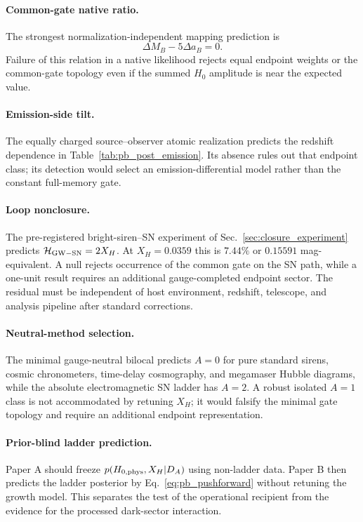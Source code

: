 \documentclass[aps,prd,twocolumn,10pt,superscriptaddress,nofootinbib]{revtex4-2}
\begin{document}
\paragraph{Common-gate native ratio.}
The strongest normalization-independent mapping prediction is
\begin{equation}
\Delta M_B-5\Delta a_B=0.
\label{eq:pb_native_null}
\end{equation}
Failure of this relation in a native likelihood rejects equal endpoint
weights or the common-gate topology even if the summed $H_0$ amplitude is
near the expected value.

\paragraph{Emission-side tilt.}
The equally charged source--observer atomic realization predicts the
redshift dependence in Table~\ref{tab:pb_post_emission}.  Its absence rules
out that endpoint class; its detection would select an emission-differential
model rather than the constant full-memory gate.

\paragraph{Loop nonclosure.}
The pre-registered bright-siren--SN experiment of
Sec.~\ref{sec:closure_experiment} predicts
$\mathcal H_{\rm GW-SN}=2X_H$.  At $X_H=0.0359$ this is $7.44\%$ or
$0.15591$ mag-equivalent.  A null rejects occurrence of the common gate on
the SN path, while a one-unit result requires an additional gauge-completed
endpoint sector.  The residual must be independent of host environment,
redshift, telescope, and analysis pipeline after standard corrections.

\paragraph{Neutral-method selection.}
The minimal gauge-neutral bilocal predicts $A=0$ for pure standard sirens,
cosmic chronometers, time-delay cosmography, and megamaser Hubble diagrams,
while the absolute electromagnetic SN ladder has $A=2$.  A robust isolated
$A=1$ class is not accommodated by retuning $X_H$; it would falsify the
minimal gate topology and require an additional endpoint representation.

\paragraph{Prior-blind ladder prediction.}
Paper A should freeze $p(H_{0,\rm phys},X_H|D_A)$ using non-ladder data.
Paper B then predicts the ladder posterior by Eq.~\eqref{eq:pb_pushforward}
without retuning the growth model.  This separates the test of the
operational recipient from the evidence for the processed dark-sector
interaction.
\end{document}
